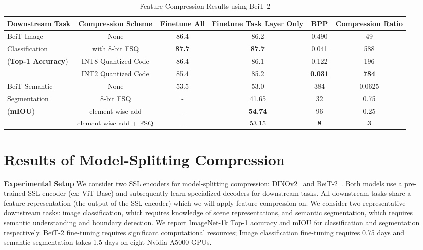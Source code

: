 \documentclass[10pt,twocolumn,letterpaper]{article}
\begin{document}
\begin{table}
\centering
\caption{Feature Compression Results using BeiT-2}
\label{tab:feature_compression_results}
\begin{tabular}{l|ccccc}
\toprule
Downstream Task & Compression Scheme & Finetune All & Finetune Task Layer Only & BPP & Compression Ratio \\
\midrule
\cmidrule(lr){1-5}
BeiT Image & None & 86.4 & 86.2 & 0.490 & 49 \\
  Classification & with 8-bit FSQ & \textbf{87.7} & \textbf{87.7} & 0.041 & 588 \\
(\textbf{Top-1 Accuracy}) &INT8 Quantized Code & 86.4 & 86.1 & 0.122 & 196 \\
&INT2 Quantized Code & 85.4 & 85.2 & \textbf{0.031} & \textbf{784} \\
\midrule
\cmidrule(lr){1-5}
BeiT Semantic & None & 53.5 & 53.0 & 384 & 0.0625 \\
 Segmentation & 8-bit FSQ & - & 41.65 & 32 & 0.75 \\
(\textbf{mIOU})  & element-wise add & - & \textbf{54.74} & 96 & 0.25 \\
  &  element-wise add + FSQ & - & 53.15 & \textbf{8} & \textbf{3} \\
\bottomrule
\end{tabular}
\end{table}

\section{Results of Model-Splitting Compression}
\label{sec:model-splitting-results}
\textbf{Experimental Setup} We consider two SSL encoders for model-splitting compression: DINOv2~\cite{oquab2023dinov2} and BeiT-2~\cite{peng2022beit}. Both models use a pre-trained SSL encoder (ex: ViT-Base) and subsequently learn specialized decoders for downstream tasks. All downstream tasks share a feature representation (the output of the SSL encoder) which we will apply feature compression on. We consider two representative downstream tasks: image classification, which requires knowledge of scene representations, and semantic segmentation, which requires semantic understanding and boundary detection. We report ImageNet-1k Top-1 accuracy and mIOU for classification and segmentation respectively. BeiT-2 fine-tuning requires significant computational resources; Image classification fine-tuning requires 0.75 days and semantic segmentation takes 1.5 days on eight Nvidia A5000 GPUs. 
\end{document}
